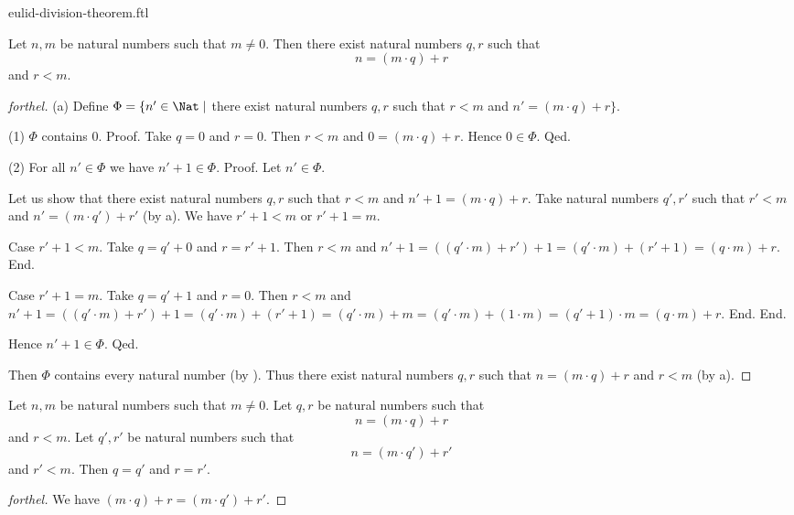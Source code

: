 \documentclass{naproche-library}
\begin{document}
\begin{smodule}{eulid-division-theorem.ftl}

  \begin{theorem}[forthel,title=Euclid's Division Theorem: Existence,id=euclid_existence]
    Let $n, m$ be natural numbers such that $m \neq 0$.
    Then there exist natural numbers $q, r$ such that
    \[n = (m \cdot q) + r\]
    and $r < m$.
  \end{theorem}
  \begin{proof}[forthel]
    (a) Define $\Phi = \{ n' \in \Nat \mid$ there exist natural numbers $q, r$ such that $r < m$ and $n' = (m \cdot q) + r \}$.

    (1) $\Phi$ contains $0$.
    Proof.
      Take $q = 0$ and $r = 0$.
      Then $r < m$ and $0 = (m \cdot q) + r$.
      Hence $0 \in \Phi$.
    Qed.

    (2) For all $n' \in \Phi$ we have $n' + 1 \in \Phi$.
    Proof.
      Let $n' \in \Phi$.

      Let us show that there exist natural numbers $q, r$ such that $r < m$ and $n' + 1 = (m \cdot q) + r$.
        Take natural numbers $q', r'$ such that $r' < m$ and $n' = (m \cdot q') + r'$ (by a).
        We have $r' + 1 < m$ or $r' + 1 = m$.

        Case $r' + 1 < m$.
          Take $q = q' + 0$ and $r = r' + 1$. %
          Then $r < m$ and $n' + 1
            = ((q' \cdot m) + r') + 1
            = (q' \cdot m) + (r' + 1)
            = (q \cdot m) + r$.
        End.

        Case $r' + 1 = m$.
          Take  $q = q' + 1$ and $r = 0$.
          Then $r < m$ and
          $n' + 1
            = ((q' \cdot m) + r') + 1
            = (q' \cdot m) + (r' + 1)
            = (q' \cdot m) + m
            = (q' \cdot m) + (1 \cdot m)
            = (q' + 1) \cdot m
            = (q \cdot m) + r$.
        End.
      End.

      Hence $n' + 1 \in \Phi$.
    Qed.

    Then $\Phi$ contains every natural number (by ).
    Thus there exist natural numbers $q, r$ such that $n = (m \cdot q) + r$ and $r < m$ (by a).
  \end{proof}
  
  \begin{theorem}[forthel,title=Euclid's Division Theorem: Uniqueness,id=euclid_uniqueness]
    Let $n, m$ be natural numbers such that $m \neq 0$.
    Let $q, r$ be natural numbers such that
    \[n = (m \cdot q) + r\]
    and $r < m$.
    Let $q', r'$ be natural numbers such that
    \[n = (m \cdot q') + r'\]
    and $r' < m$.
    Then $q = q'$ and $r = r'$.
  \end{theorem}
  \begin{proof}[forthel]
    We have $(m \cdot q) + r = (m \cdot q') + r'$.


\end{proof}
\end{smodule}
\end{document}
